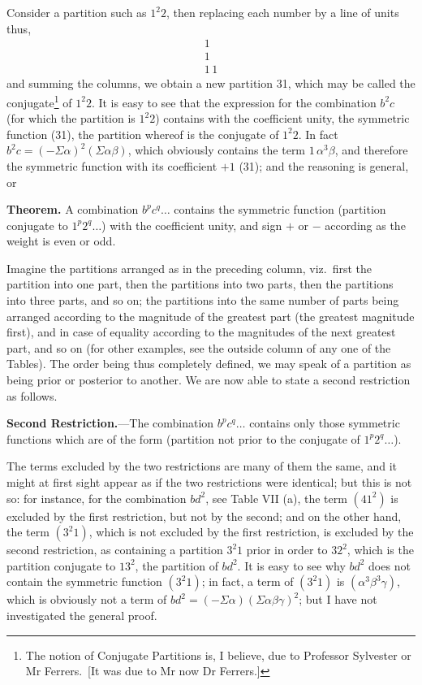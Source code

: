 \documentclass[11pt]{article}
\begin{document}
Consider a partition such as $1^2 2$, then replacing each number by a line of units thus,
\[
\begin{array}{c} 1 \\ 1 \\ 1\,1 \end{array}
\]
and summing the columns, we obtain a new partition 31, which may be called the conjugate\footnote{The notion of Conjugate Partitions is, I believe, due to Professor Sylvester or Mr Ferrers.\ [It was due to Mr now Dr Ferrers.]} of $1^2 2$. It is easy to see that the expression for the combination $b^2 c$ (for which the partition is $1^2 2$) contains with the coefficient unity, the symmetric function (31), the partition whereof is the conjugate of $1^2 2$. In fact $b^2 c = (-\Sigma\alpha)^2 (\Sigma\alpha\beta)$, which obviously contains the term $1\,\alpha^3\beta$, and therefore the symmetric function with its coefficient $+1$ (31); and the reasoning is general, or

\medskip

\noindent\textbf{Theorem.} A combination $b^p c^q\ldots$ contains the symmetric function (partition conjugate to $1^p 2^q\ldots$) with the coefficient unity, and sign $+$ or $-$ according as the weight is even or odd.

\medskip

Imagine the partitions arranged as in the preceding column, viz.\ first the partition into one part, then the partitions into two parts, then the partitions into three parts, and so on; the partitions into the same number of parts being arranged according to the magnitude of the greatest part (the greatest magnitude first), and in case of equality according to the magnitudes of the next greatest part, and so on (for other examples, see the outside column of any one of the Tables). The order being thus completely defined, we may speak of a partition as being prior or posterior to another. We are now able to state a second restriction as follows.

\medskip

\noindent\textbf{Second Restriction.}---The combination $b^p c^q\ldots$ contains only those symmetric functions which are of the form (partition not prior to the conjugate of $1^p 2^q\ldots$).

\medskip

The terms excluded by the two restrictions are many of them the same, and it might at first sight appear as if the two restrictions were identical; but this is not so: for instance, for the combination $bd^2$, see Table VII (a), the term $(41^2)$ is excluded by the first restriction, but not by the second; and on the other hand, the term $(3^2 1)$, which is not excluded by the first restriction, is excluded by the second restriction, as containing a partition $3^2 1$ prior in order to $32^2$, which is the partition conjugate to $13^2$, the partition of $bd^2$. It is easy to see why $bd^2$ does not contain the symmetric function $(3^2 1)$; in fact, a term of $(3^2 1)$ is $(\alpha^3 \beta^3 \gamma)$, which is obviously not a term of $bd^2 = (-\Sigma\alpha)(\Sigma\alpha\beta\gamma)^2$; but I have not investigated the general proof.
\end{document}
